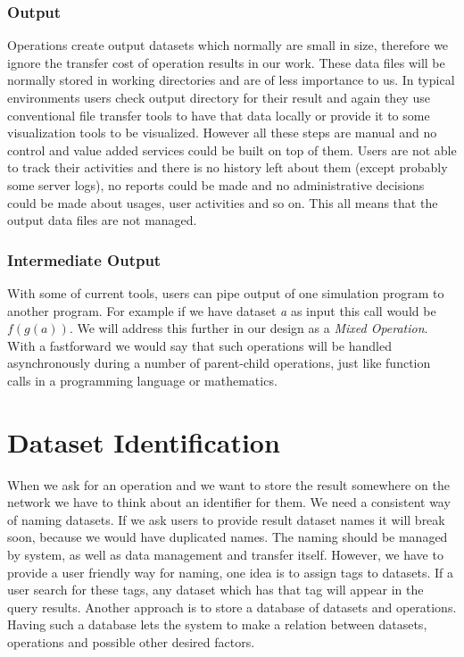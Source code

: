 \subsubsection{Output}
Operations create output datasets which normally are small in size, therefore we ignore the transfer cost of operation
results in our work. These data files will be normally stored in working directories and are of less importance to us.
In typical environments users check output directory for their result and again they use conventional file transfer
tools to have that data locally or provide it to some visualization tools to be visualized. However all these steps
are manual and no control and value added services could be built on top of them. Users are not able to track their
activities and there is no history left about them (except probably some server logs), no reports could be made and no
administrative decisions could be made about usages, user activities and so on. This all means that the output data files
are not managed.

\subsubsection{Intermediate Output}
With some of current tools, users can pipe output of one simulation program to another program.
For example if we have dataset \textit{a} as input this call would be \(f(g(a))\). 
We will address this further in our design as a \textit{Mixed Operation}.
With a fastforward we would say that such operations will be handled asynchronously during a number of parent-child operations,
just like function calls in a programming language or mathematics.

\section{Dataset Identification}
When we ask for an operation and we want to store the result somewhere on the network we have to think about an identifier
for them. 
We need a consistent way of naming datasets. If we ask users to provide result dataset names it will break soon, because we
would have duplicated names. The naming should be managed by system, as well as data management and transfer itself. 
However, we have to provide a user friendly way for naming, one idea is to assign tags to datasets. If a user search for
these tags, any dataset which has that tag will appear in the query results.
Another approach is to store a database of datasets and operations. Having such a database lets the system to make a relation
between datasets, operations and possible other desired factors.

